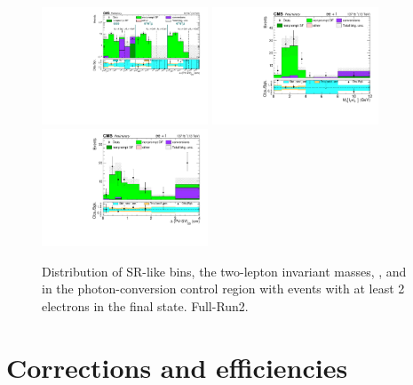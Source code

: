  \begin{figure}[h]
\centering
\includegraphics[height=3.5cm]{Figures/c6/backgrounds/FR/closureTest/Data/conversion/M-6_V-0p00202484567313_e_ele_datacard_combined_SR.pdf}
  \includegraphics[height=3.5cm]{Figures/c6/backgrounds/FR/closureTest/Data/conversion/M-6_V-0p00202484567313_e_ele_mass_datacard_combined_massl2l3.pdf}
  \includegraphics[height=3.5cm]{Figures/c6/backgrounds/FR/closureTest/Data/conversion/M-6_V-0p00202484567313_e_ele_disp_datacard_combined_displacement.pdf}
    \caption{Distribution of SR-like bins, the two-lepton invariant
    masses, \mtwol, and \Deltwod in the photon-conversion control
    region with events with at least 2 electrons in the final state. Full-Run2.}
  \label{fig:phoConv}
\end{figure}

\clearpage
\section{Corrections and efficiencies}\label{sec:llcorrection_efficiencies}

